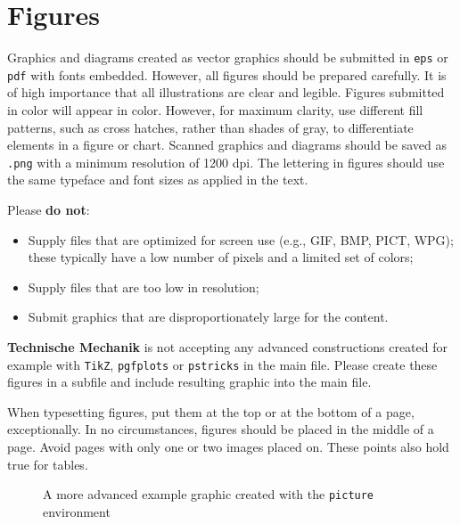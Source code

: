 \documentclass{techmech}
\begin{document}
\section{Figures}
Graphics and diagrams created as vector graphics should be submitted in \texttt{eps} or \texttt{pdf} with fonts embedded. However, all figures should be prepared carefully. It is of high importance that all illustrations are clear and legible. Figures submitted in color will appear in color. However, for maximum clarity, use different fill patterns, such as cross hatches, rather than shades of gray, to differentiate elements in a figure or chart. Scanned graphics and diagrams should be saved as \texttt{.png} with a minimum resolution of 1200 dpi. The lettering in figures should use the same typeface and font sizes as applied in the text. 

Please \textbf{do not}:
\begin{itemize}
\item Supply files that are optimized for screen use (e.g., GIF, BMP, PICT, WPG); these typically have a
low number of pixels and a limited set of colors;
\item Supply files that are too low in resolution;
\item Submit graphics that are disproportionately large for the content.
\end{itemize}

\textsf{\bfseries Technische Mechanik} is not accepting any advanced constructions created for example with \texttt{TikZ}, \texttt{pgfplots} or \texttt{pstricks} in the main file. Please create these figures in a subfile and include resulting graphic into the main file.

When typesetting figures, put them at the top or at the bottom of a page, exceptionally. In no circumstances, figures should be placed in the middle of a page. Avoid pages with only one or two images placed on. These points also hold true for tables.

\begin{figure}[t]
\caption{A more advanced example graphic created with the \texttt{picture} environment}
\label{fig-1}
\end{figure}

\end{document}

